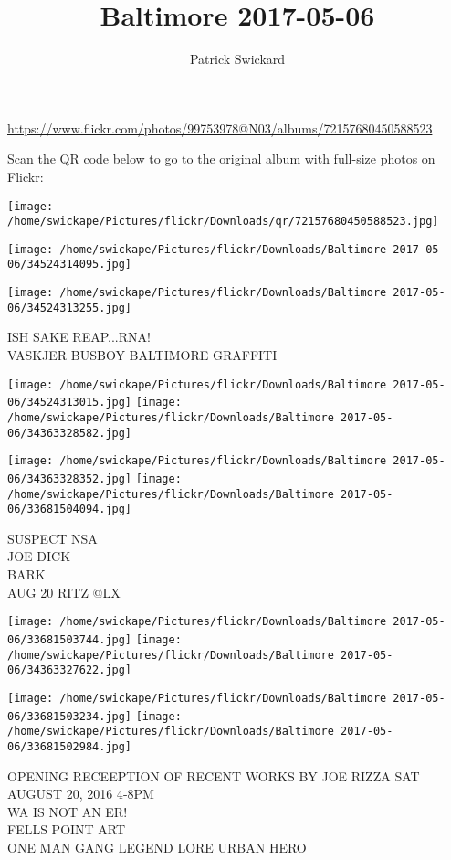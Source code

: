 \documentclass[10pt,letterpaper]{article}
\title{Baltimore 2017-05-06}
\author{Patrick Swickard}
\date{}
\begin{document}
\maketitle

\url{https://www.flickr.com/photos/99753978@N03/albums/72157680450588523}

Scan the QR code below to go to the original album with full-size photos on Flickr:

\texttt{[image: /home/swickape/Pictures/flickr/Downloads/qr/72157680450588523.jpg]}
\pagebreak

\texttt{[image: /home/swickape/Pictures/flickr/Downloads/Baltimore 2017-05-06/34524314095.jpg]}

\vspace{0.25in}
\texttt{[image: /home/swickape/Pictures/flickr/Downloads/Baltimore 2017-05-06/34524313255.jpg]}

ISH SAKE REAP...RNA!\\
VASKJER BUSBOY BALTIMORE GRAFFITI
\pagebreak

\texttt{[image: /home/swickape/Pictures/flickr/Downloads/Baltimore 2017-05-06/34524313015.jpg]}
\texttt{[image: /home/swickape/Pictures/flickr/Downloads/Baltimore 2017-05-06/34363328582.jpg]}

\texttt{[image: /home/swickape/Pictures/flickr/Downloads/Baltimore 2017-05-06/34363328352.jpg]}
\texttt{[image: /home/swickape/Pictures/flickr/Downloads/Baltimore 2017-05-06/33681504094.jpg]}

SUSPECT NSA\\
JOE DICK\\
BARK\\
AUG 20 RITZ @LX
\pagebreak

\texttt{[image: /home/swickape/Pictures/flickr/Downloads/Baltimore 2017-05-06/33681503744.jpg]}
\texttt{[image: /home/swickape/Pictures/flickr/Downloads/Baltimore 2017-05-06/34363327622.jpg]}

\texttt{[image: /home/swickape/Pictures/flickr/Downloads/Baltimore 2017-05-06/33681503234.jpg]}
\texttt{[image: /home/swickape/Pictures/flickr/Downloads/Baltimore 2017-05-06/33681502984.jpg]}

OPENING RECEEPTION OF RECENT WORKS BY JOE RIZZA SAT AUGUST 20, 2016 4{-}8PM\\
WA IS NOT AN ER!\\
FELLS POINT ART\\
ONE MAN GANG LEGEND LORE URBAN HERO
\pagebreak
\end{document}
